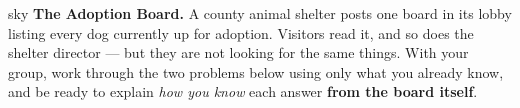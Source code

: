 \documentclass[12pt]{article}
\begin{document}

\vspace{0.06in}

\begin{headlinebox}{sky}
\textbf{The Adoption Board.} A county animal shelter posts one board in its lobby listing every
dog currently up for adoption. Visitors read it, and so does the shelter director --- but they
are not looking for the same things. With your group, work through the two problems below using
only what you already know, and be ready to explain \emph{how you know} each answer
\textbf{from the board itself}.
\end{headlinebox}

\vspace{0.04in}
\end{document}
